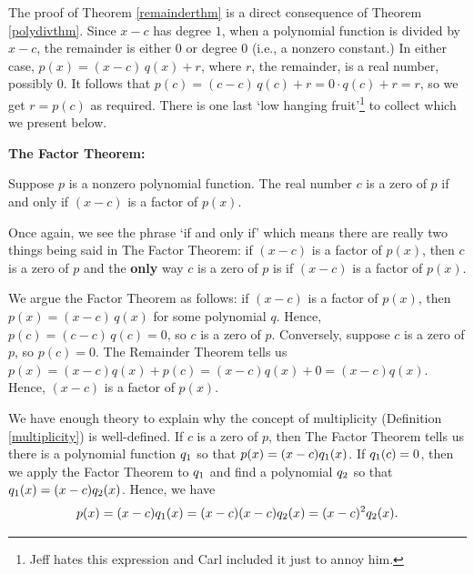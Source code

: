 \documentclass{ximera}
\begin{document}
The proof of Theorem \ref{remainderthm} is a direct consequence of Theorem \ref{polydivthm}.  Since  $x-c$ has degree $1$, when a polynomial function is divided by $x-c$, the remainder is either $0$ or degree $0$ (i.e., a nonzero constant.)   In either case, $p(x) = (x-c) \, q(x) + r$, where $r$, the remainder, is a real number, possibly $0$.  It follows that $p(c) = (c-c) \, q(c) + r = 0 \cdot q(c) + r = r$, so we get $r = p(c)$ as required.  There is one last `low hanging fruit'\footnote{Jeff hates this expression and Carl included it just to annoy him.} to collect which we present below.

\medskip


\begin{theorem} \label{factorthm}\textbf{The Factor Theorem:}  

Suppose $p$ is a nonzero polynomial function.  The real number $c$ is a zero of $p$ if and only if $(x-c)$ is a factor of $p(x)$.  

\end{theorem}

\medskip

Once again, we see the phrase `if and only if' which means there are really two things being said in  The Factor Theorem:  if $(x-c)$ is a factor of $p(x)$, then $c$ is a zero of $p$ and the \textbf{only} way $c$ is a zero  of $p$ is if $(x-c)$ is a factor of $p(x)$.  

\medskip

We argue the Factor Theorem as follows:   if $(x-c)$ is a factor of $p(x)$, then $p(x) = (x-c) \, q(x)$ for some polynomial $q$.  Hence, $p(c) = (c-c) \, q(c) = 0$, so $c$ is a zero of $p$.  Conversely, suppose $c$ is a zero of $p$, so $p(c) = 0$.   The Remainder Theorem tells us $p(x) = (x-c)q(x) + p(c) = (x-c)q(x) + 0 = (x-c)q(x)$.   Hence, $(x-c)$ is a factor of $p(x)$. 

\medskip

We have enough theory to explain why the concept of multiplicity (Definition \ref{multiplicity}) is well-defined. If $c$ is a zero of $p$, then The Factor Theorem tells us there is a polynomial function $q_{\text{\scriptsize $1$}}$ so that $p(x) = (x-c)q_{\text{\scriptsize $1$}}(x)$.  If $q_{\text{\scriptsize $1$}}(c) = 0$, then we apply the Factor Theorem to $q_{\text{\scriptsize $1$}}$ and find a  polynomial $q_{\text{\scriptsize $2$}}$ so that $q_{\text{\scriptsize $1$}}(x)  = (x-c) q_{\text{\scriptsize $2$}}(x)$.    Hence, we have  \[p(x) = (x-c) q_{\text{\scriptsize $1$}}(x) = (x-c) (x-c) q_{\text{\scriptsize $2$}}(x) = (x-c)^2 q_{\text{\scriptsize $2$}}(x).\]
\end{document}
